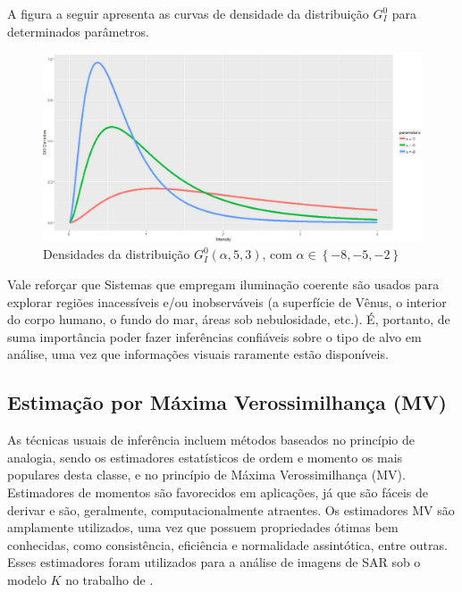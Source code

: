 \documentclass[12pt]{article}
\begin{document}
A figura a seguir apresenta as curvas de densidade da distribuição $G_I^0$ para determinados parâmetros.
\begin{figure}[H]
     \centering
     \includegraphics[scale=0.5]{plots/GI0Densities.pdf}
     \caption{Densidades da distribuição $G_I^0(\alpha, 5, 3)$, com $\alpha \in \left \{  -8, -5, -2 \right \}$}
     \label{graf_1}
\end{figure}

Vale reforçar que Sistemas que empregam iluminação coerente são usados para explorar regiões inacessíveis e/ou inobserváveis (a superfície de Vênus, o interior do corpo humano, o fundo do mar, áreas sob nebulosidade, etc.). É, portanto, de suma importância poder fazer inferências confiáveis sobre o tipo de alvo em análise, uma vez que informações visuais raramente estão disponíveis.


\subsection{Estimação por Máxima Verossimilhança (MV)}

As técnicas usuais de inferência incluem métodos baseados no princípio de analogia, sendo os estimadores estatísticos de ordem e momento os mais populares desta classe, e no princípio de Máxima Verossimilhança (MV). Estimadores de momentos são favorecidos em aplicações, já que são fáceis de derivar e são, geralmente, computacionalmente atraentes. Os estimadores MV são amplamente utilizados, uma vez que possuem propriedades ótimas bem conhecidas, como consistência, eficiência e normalidade assintótica, entre outras. Esses estimadores foram utilizados para a análise de imagens de SAR sob o modelo $K$ no trabalho de \citet{KMaxVer_Joughin}.
\end{document}
